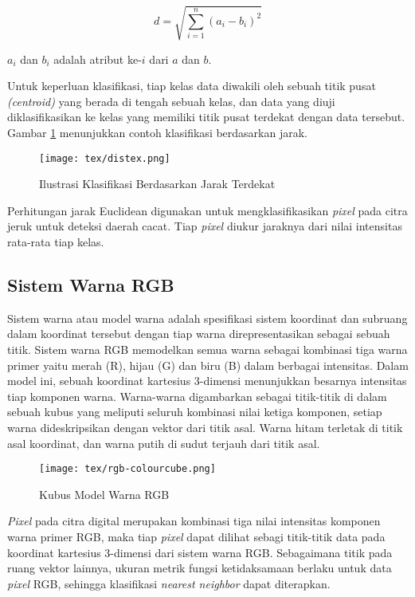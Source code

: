 \documentclass[laporan.tex]{subfiles}
\begin{document}
\begin{equation}
	d=\sqrt{\sum_{i=1}^n (a_i - b_i)^2}
\end{equation}

$a_i$ dan $b_i$ adalah atribut ke-$i$ dari $a$ dan $b$.

Untuk keperluan klasifikasi, tiap kelas data diwakili oleh sebuah titik pusat \emph{(centroid)} yang berada di tengah sebuah kelas, dan data yang diuji diklasifikasikan ke kelas yang memiliki titik pusat terdekat dengan data tersebut. Gambar \ref{fig:distex} menunjukkan contoh klasifikasi berdasarkan jarak.

\begin{figure}[h]
\centering
\texttt{[image: tex/distex.png]}
\caption{Ilustrasi Klasifikasi Berdasarkan Jarak Terdekat}
\label{fig:distex}
\end{figure}

Perhitungan jarak Euclidean digunakan untuk mengklasifikasikan \emph{pixel} pada citra jeruk untuk deteksi daerah cacat. Tiap \emph{pixel} diukur jaraknya dari nilai intensitas rata-rata tiap kelas.

\subsection{Sistem Warna RGB}
Sistem warna atau model warna adalah spesifikasi sistem koordinat dan subruang dalam koordinat tersebut dengan tiap warna direpresentasikan sebagai sebuah titik. Sistem warna RGB memodelkan semua warna sebagai kombinasi tiga warna primer yaitu merah (R), hijau (G) dan biru (B) dalam berbagai intensitas. Dalam model ini, sebuah koordinat kartesius 3-dimensi menunjukkan besarnya intensitas tiap komponen warna. Warna-warna digambarkan sebagai titik-titik di dalam sebuah kubus yang meliputi seluruh kombinasi nilai ketiga komponen, setiap warna dideskripsikan dengan vektor dari titik asal. Warna hitam terletak di titik asal koordinat, dan warna putih di sudut terjauh dari titik asal\cite{gon}.

\begin{figure}[h!]
\centering
\texttt{[image: tex/rgb-colourcube.png]}
\caption{Kubus Model Warna RGB}
\end{figure}

\emph{Pixel} pada citra digital merupakan kombinasi tiga nilai intensitas komponen warna primer RGB, maka tiap \emph{pixel} dapat dilihat sebagi titik-titik data pada koordinat kartesius 3-dimensi dari sistem warna RGB. Sebagaimana titik pada ruang vektor lainnya, ukuran metrik fungsi ketidaksamaan berlaku untuk data \emph{pixel} RGB, sehingga klasifikasi \emph{nearest neighbor} dapat diterapkan.
\end{document}
